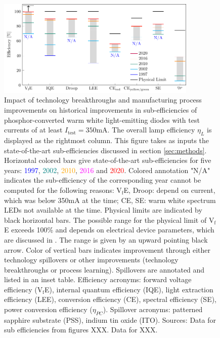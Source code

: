 \documentclass[a4paper]{spie}  %
\begin{document}
\begin{figure} [ht]
    \begin{center}
        \includegraphics[width=0.85\textwidth]{SPIE/article/breakthroughs_efficiency.pdf}
    \end{center}
    \caption{Impact of technology breakthroughs and manufacturing process improvements on historical improvements in sub-efficiencies of phosphor-converted warm white light-emitting diodes with test currents of at least $I_\text{test}=350$mA. The overall lamp efficiency $\eta_L$ is displayed as the rightmost column. This figure takes as inputs the state-of-the-art sub-efficiencies discussed in section \ref{sec:methods}. Horizontal colored bars give state-of-the-art sub-efficiencies for five years: \textcolor{blue}{1997}, \textcolor{teal}{2002}, \textcolor{orange}{2010}, \textcolor{magenta}{2016} and \textcolor{red}{2020}. Colored annotation "N/A" indicates the sub-efficiency of the corresponding year cannot be computed for the following reasons: V$_\text{f}$E, Droop: depend on current, which was below 350mA at the time; CE, SE: warm white spectrum LEDs not available at the time. Physical limits are indicated by black horizontal bars. The possible range for the physical limit of V$_\text{f}$E exceeds 100\% and depends on electrical device parameters, which are discussed in \cite{david2016electrical}. The range is given by an upward pointing black arrow. Color of vertical bars indicates improvement through either technology spillovers or other improvements (technology breakthroughs or process learning). Spillovers are annotated and listed in an inset table. Efficiency acronyms: forward voltage efficiency (V$_\text{f}$E), internal quantum efficiency (IQE), light extraction efficiency (LEE), conversion efficiency (CE), spectral efficiency (SE), power conversion efficiency ($\eta_{PC}$). Spillover acronyms: patterned sapphire substrate (PSS), indium tin oxide (ITO). Sources: Data for sub efficiencies from figures XXX. Data for XXX.}
\end{figure}
\end{document}
